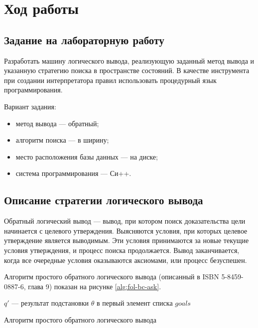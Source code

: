 \chapter{Ход работы}

\section{Задание на лабораторную работу}

Разработать машину логического вывода, реализующую заданный метод
вывода и указанную стратегию поиска в пространстве состояний. В качестве
инструмента при создании интерпретатора правил использовать процедурный
язык программирования.

Вариант задания:
\begin{itemize}
    \item метод вывода --- обратный;
    \item алгоритм поиска --- в ширину;
    \item место расположения базы данных --- на диске;
    \item система программирования --- Си++.
\end{itemize}

\section{Описание стратегии логического вывода}

Обратный логический вывод --- вывод, при котором поиск доказательства цели начинается с целевого утверждения. Выясняются условия, при которых целевое утверждение является выводимым. Эти условия принимаются за новые текущие условия утверждения, и процесс поиска продолжается. Вывод заканчивается, когда все очередные условия оказываются аксиомами, или процесс безуспешен.

Алгоритм простого обратного логического вывода (описанный в ISBN 5-8459-0887-6, глава 9) показан на рисунке \ref{alg:fol-bc-ask}.

\begin{algorithm}[H]
$q'$ --- результат подстановки $\theta$ в первый элемент списка $goals$\;
\;
\caption{Алгоритм простого обратного логического вывода} \label{alg:fol-bc-ask}
\end{algorithm}

